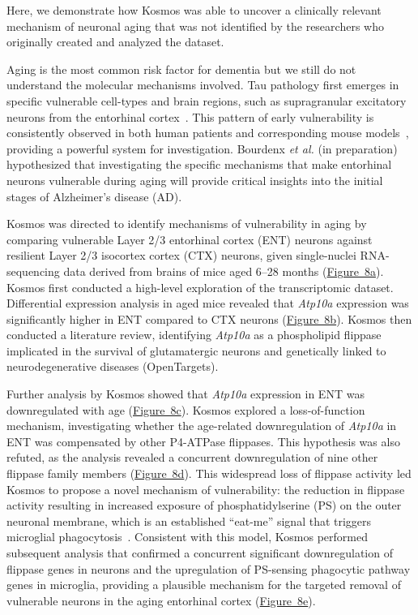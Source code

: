 \documentclass{article}
\begin{document}
Here, we demonstrate how Kosmos was able to uncover a clinically relevant mechanism of neuronal aging that was not identified by the researchers who originally created and analyzed the dataset.

Aging is the most common risk factor for dementia but we still do not understand the molecular mechanisms involved. Tau pathology first emerges in specific vulnerable cell-types and brain regions, such as supragranular excitatory neurons from the entorhinal cortex~\cite{mrdjen_basis_2019}. This pattern of early vulnerability is consistently observed in both human patients and corresponding mouse models~\cite{watamura_vivo_2025, fu_selective_2018}, providing a powerful system for investigation. Bourdenx \textit{et al.} (in preparation) hypothesized that investigating the specific mechanisms that make entorhinal neurons vulnerable during aging will provide critical insights into the initial stages of Alzheimer's disease (AD).

Kosmos was directed to identify mechanisms of vulnerability in aging by comparing vulnerable Layer 2/3 entorhinal cortex (ENT) neurons against resilient Layer 2/3 isocortex cortex (CTX) neurons, given single-nuclei RNA-sequencing data derived from brains of mice aged 6--28 months (\hyperref[fig:fig8]{Figure~8a}). Kosmos first conducted a high-level exploration of the transcriptomic dataset. Differential expression analysis in aged mice revealed that \textit{Atp10a} expression was significantly higher in ENT compared to CTX neurons (\hyperref[fig:fig8]{Figure~8b}). Kosmos then conducted a literature review, identifying \textit{Atp10a} as a phospholipid flippase implicated in the survival of glutamatergic neurons and genetically linked to neurodegenerative diseases (OpenTargets). 

Further analysis by Kosmos showed that \textit{Atp10a} expression in ENT was downregulated with age (\hyperref[fig:fig8]{Figure~8c}). Kosmos explored a loss-of-function mechanism, investigating whether the age-related downregulation of \textit{Atp10a} in ENT was compensated by other P4-ATPase flippases. This hypothesis was also refuted, as the analysis revealed a concurrent downregulation of nine other flippase family members (\hyperref[fig:fig8]{Figure~8d}). This widespread loss of flippase activity led Kosmos to propose a novel mechanism of vulnerability: the reduction in flippase activity resulting in increased exposure of phosphatidylserine (PS) on the outer neuronal membrane, which is an established ``eat-me'' signal that triggers microglial phagocytosis~\cite{scotthewitt_local_2020}. Consistent with this model, Kosmos performed subsequent analysis that confirmed a concurrent significant downregulation of flippase genes in neurons and the upregulation of PS-sensing phagocytic pathway genes in microglia, providing a plausible mechanism for the targeted removal of vulnerable neurons in the aging entorhinal cortex (\hyperref[fig:fig8]{Figure~8e}). 
\end{document}
